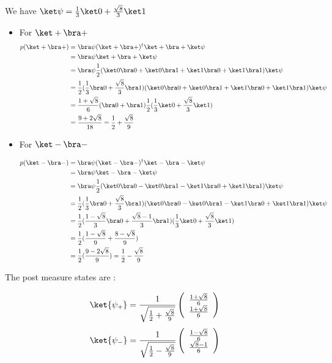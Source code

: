 We have $\ket \psi = \frac 1 3 \ket 0 + \frac{\sqrt 8} 3 \ket 1$

\begin{itemize}
  \item For $\ket + \bra +$
    \begin{align*}
      p(\ket + \bra +) &= \bra \psi (\ket + \bra +)^\dagger \ket + \bra + \ket \psi \\
      &= \bra \psi \ket + \bra + \ket \psi \\
      &= \bra \psi \frac 1 2
        (\ket 0 \bra 0 + \ket 0 \bra 1 + \ket 1 \bra 0 + \ket 1 \bra 1) \ket \psi \\
      &= \frac 1 2 (\frac 1 3 \bra 0+ \frac{\sqrt 8}{3}\bra 1)
        (\ket 0 \bra 0 + \ket 0 \bra 1 + \ket 1 \bra 0 + \ket 1 \bra 1) \ket
        \psi \\
      &= \frac{1+\sqrt8}{6}(\bra 0 + \bra 1) \frac 1 2 (\frac 1 3 \ket 0+
          \frac{\sqrt 8}{3}\ket 1) \\
      &= \frac{9 + 2\sqrt 8}{18} = \frac 1 2 + \frac{\sqrt 8}{9}
    \end{align*}

  \item For $\ket - \bra -$

    \begin{align*}
      p(\ket - \bra -) &= \bra \psi (\ket - \bra -)^\dagger \ket - \bra - \ket \psi \\
      &= \bra \psi \ket - \bra - \ket \psi \\
      &= \bra \psi \frac 1 2
        (\ket 0 \bra 0 - \ket 0 \bra 1 - \ket 1 \bra 0 + \ket 1 \bra 1) \ket \psi \\
      &= \frac 1 2 (\frac 1 3 \bra 0+ \frac{\sqrt 8}{3}\bra 1)
        (\ket 0 \bra 0 - \ket 0 \bra 1 - \ket 1 \bra 0 + \ket 1 \bra 1) \ket
        \psi \\
      &= \frac{1}{2}(\frac{1-\sqrt 8}{3}\bra 0 + \frac{\sqrt 8-1}{3}\bra 1)
          (\frac 1 3 \ket 0+ \frac{\sqrt 8}{3}\ket 1) \\
      &= \frac 1 2 (\frac{1-\sqrt 8}{9} + \frac{8-\sqrt 8}{9}) \\
      &= \frac 1 2 (\frac{9 - 2\sqrt 8}{9}) = \frac 1 2 - \frac{\sqrt 8}{9}
    \end{align*}
\end{itemize}

The post measure states are :

\begin{align*}
  \ket{\psi_+} &= \frac{1}{\sqrt{\frac 1 2 + \frac{\sqrt 8}{9}}}
  \left(\begin{array}{c}
    \frac{1 + \sqrt8}{6} \\
    \frac{1 + \sqrt8}{6}
  \end{array}\right)
\end{align*}
\begin{align*}
  \ket{\psi_-} &= \frac{1}{\sqrt{\frac 1 2 - \frac{\sqrt 8}{9}}}
  \left(\begin{array}{c}
    \frac{1 - \sqrt8}{6} \\
    \frac{\sqrt8 -1}{6}
  \end{array}\right)
\end{align*}

